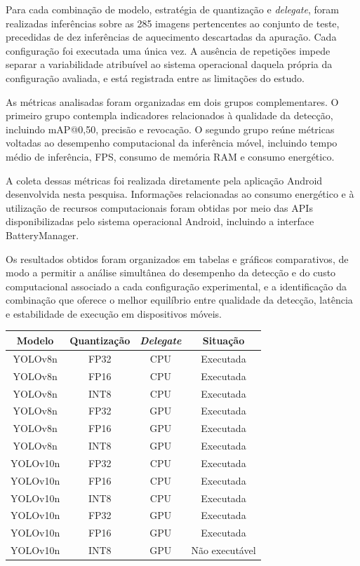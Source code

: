 \documentclass[artigo,times,capa]{iftex2024}
\begin{document}
Para cada combinação de modelo, estratégia de quantização e \textit{delegate},
foram realizadas inferências sobre as 285 imagens pertencentes ao conjunto de
teste, precedidas de dez inferências de aquecimento descartadas da apuração.
Cada configuração foi executada uma única vez. A ausência de repetições impede
separar a variabilidade atribuível ao sistema operacional daquela própria da
configuração avaliada, e está registrada entre as limitações do estudo.

As métricas analisadas foram organizadas em dois grupos complementares. O primeiro grupo contempla indicadores relacionados à qualidade da detecção, incluindo \ac{mAP}@0,50, precisão e revocação. O segundo grupo reúne métricas voltadas ao desempenho computacional da inferência móvel, incluindo tempo médio de inferência, \ac{FPS}, consumo de memória \ac{RAM} e consumo energético.

A coleta dessas métricas foi realizada diretamente pela aplicação Android desenvolvida nesta pesquisa. Informações relacionadas ao consumo energético e à utilização de recursos computacionais foram obtidas por meio das APIs disponibilizadas pelo sistema operacional Android, incluindo a interface BatteryManager.

Os resultados obtidos foram organizados em tabelas e gráficos comparativos, de modo a permitir a análise simultânea do desempenho da detecção e do custo computacional associado a cada configuração experimental, e a identificação da combinação que oferece o melhor equilíbrio entre qualidade da detecção, latência e estabilidade de execução em dispositivos móveis.

\begin{board}[H]
\centering
\caption{Configurações avaliadas experimentalmente}
\label{quad:configuracoes_experimentos}
\begin{tabular}{cccc}
\toprule
Modelo & Quantização & \textit{Delegate} & Situação \\
\midrule
YOLOv8n & FP32 & CPU & Executada \\
YOLOv8n & FP16 & CPU & Executada \\
YOLOv8n & INT8 & CPU & Executada \\
YOLOv8n & FP32 & GPU & Executada \\
YOLOv8n & FP16 & GPU & Executada \\
YOLOv8n & INT8 & GPU & Executada \\
YOLOv10n & FP32 & CPU & Executada \\
YOLOv10n & FP16 & CPU & Executada \\
YOLOv10n & INT8 & CPU & Executada \\
YOLOv10n & FP32 & GPU & Executada \\
YOLOv10n & FP16 & GPU & Executada \\
YOLOv10n & INT8 & GPU & Não executável \\
\bottomrule
\end{tabular}
\end{board}
\end{document}
